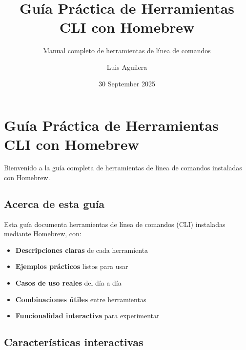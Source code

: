 \documentclass[
  11pt,
  letterpaper,
  oneside,
  openany]{scrbook}
\title{Guía Práctica de Herramientas CLI con Homebrew}
\subtitle{Manual completo de herramientas de línea de comandos}
\author{Luis Aguilera}
\date{30 September 2025}
\providecommand{\tightlist}{%
  \setlength{\itemsep}{0pt}\setlength{\parskip}{0pt}}
\renewcommand*\contentsname{Table of contents}
\newcommand\contentsname{Table of contents}
\begin{document}
\frontmatter
\maketitle

\renewcommand*\contentsname{Table of contents}
{
\hypersetup{linkcolor=}
\setcounter{tocdepth}{2}
\tableofcontents
}

\mainmatter
{}

\chapter*{Guía Práctica de Herramientas CLI con
Homebrew}\label{guuxeda-pruxe1ctica-de-herramientas-cli-con-homebrew}


Bienvenido a la guía completa de herramientas de línea de comandos
instaladas con Homebrew.

\section*{Acerca de esta guía}\label{acerca-de-esta-guuxeda}


Esta guía documenta herramientas de línea de comandos (CLI) instaladas
mediante Homebrew, con:

\begin{itemize}
\tightlist
\item
  \textbf{Descripciones claras} de cada herramienta
\item
  \textbf{Ejemplos prácticos} listos para usar
\item
  \textbf{Casos de uso reales} del día a día
\item
  \textbf{Combinaciones útiles} entre herramientas
\item
  \textbf{Funcionalidad interactiva} para experimentar
\end{itemize}

\section*{Características
interactivas}\label{caracteruxedsticas-interactivas}
\end{document}
